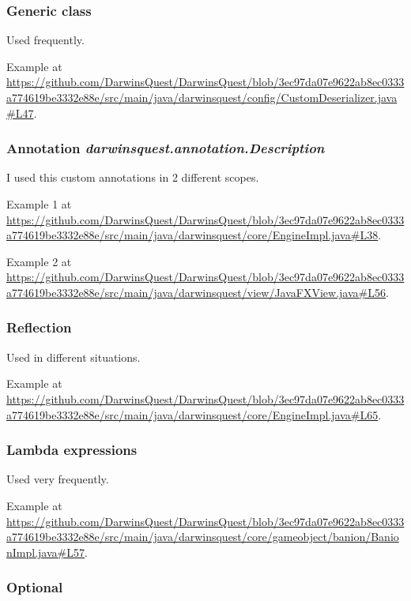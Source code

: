\documentclass[12pt, a4paper]{report}
\theoremstyle{definition}
\begin{document}
        \subsubsection{Generic class}
        
        Used frequently.

        Example at \url{https://github.com/DarwinsQuest/DarwinsQuest/blob/3ec97da07e9622ab8ec0333a774619be3332e88e/src/main/java/darwinsquest/config/CustomDeserializer.java#L47}.

        \subsubsection{Annotation \emph{darwinsquest.annotation.Description}}

        I used this custom annotations in 2 different scopes.

        Example 1 at \url{https://github.com/DarwinsQuest/DarwinsQuest/blob/3ec97da07e9622ab8ec0333a774619be3332e88e/src/main/java/darwinsquest/core/EngineImpl.java#L38}.

        Example 2 at \url{https://github.com/DarwinsQuest/DarwinsQuest/blob/3ec97da07e9622ab8ec0333a774619be3332e88e/src/main/java/darwinsquest/view/JavaFXView.java#L56}.

        \subsubsection{Reflection}

        Used in different situations.

        Example at \url{https://github.com/DarwinsQuest/DarwinsQuest/blob/3ec97da07e9622ab8ec0333a774619be3332e88e/src/main/java/darwinsquest/core/EngineImpl.java#L65}.

        \subsubsection{Lambda expressions}

        Used very frequently.

        Example at \url{https://github.com/DarwinsQuest/DarwinsQuest/blob/3ec97da07e9622ab8ec0333a774619be3332e88e/src/main/java/darwinsquest/core/gameobject/banion/BanionImpl.java#L57}.

        \subsubsection{Optional}
\end{document}
